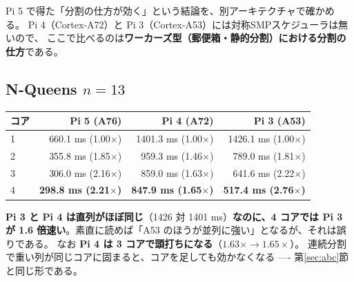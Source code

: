 \documentclass[a4paper,11pt]{ltjsarticle}
\begin{document}
Pi 5 で得た「分割の仕方が効く」という結論を、別アーキテクチャで確かめる。
Pi 4（Cortex-A72）と Pi 3（Cortex-A53）には対称SMPスケジューラは無いので、
ここで比べるのは\textbf{ワーカーズ型（郵便箱・静的分割）における分割の仕方}である。

\subsection{N-Queens $n=13$}

\begin{center}
\begin{tabular}{lrrr}
\toprule
コア & Pi 5 (A76) & Pi 4 (A72) & Pi 3 (A53) \\
\midrule
1 & 660.1 ms (1.00$\times$) & 1401.3 ms (1.00$\times$) & 1426.1 ms (1.00$\times$) \\
2 & 355.8 ms (1.85$\times$) & 959.3 ms (1.46$\times$) & 789.0 ms (1.81$\times$) \\
3 & 306.0 ms (2.16$\times$) & 859.0 ms (1.63$\times$) & 641.6 ms (2.22$\times$) \\
4 & \textbf{298.8 ms (2.21}$\times$\textbf{)} & \textbf{847.9 ms (1.65}$\times$\textbf{)}
  & \textbf{517.4 ms (2.76}$\times$\textbf{)} \\
\bottomrule
\end{tabular}
\end{center}
\begin{center}
\end{center}

\noindent
\textbf{Pi 3 と Pi 4 は直列がほぼ同じ}（1426 対 1401 ms）\textbf{なのに、4 コアでは
Pi 3 が 1.6 倍速い}。素直に読めば「A53 のほうが並列に強い」となるが、それは誤りである。
なお \textbf{Pi 4 は 3 コアで頭打ちになる}（$1.63\times \to 1.65\times$）。
連続分割で重い列が同じコアに固まると、コアを足しても効かなくなる
---- 第\ref{sec:abc}節と同じ形である。
\end{document}
